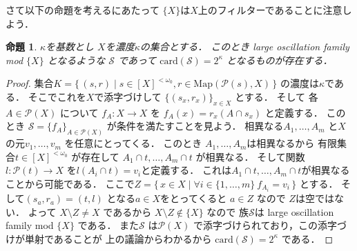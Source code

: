 \documentclass[leqno, a4paper, 12pt]{jsarticle}
\newtheorem{prop}[thm]{命題}
\newcommand{\card}{\mathrm{card}}
\newcommand{\myfinset}[1]{[#1]^{<\omega_{0}}}
\newcommand{\myfam}[1]{\mathscr{#1}}
\newcommand{\mymap}[2]{\mathrm{Map}(#1, #2)}
\newcommand{\mypowset}[1]{\mathcal{P}(#1)}
\begin{document}
さて以下の命題を考えるにあたって
$\{X\}$は$X$上のフィルターであることに注意しよう．
\begin{prop}\label{prop:oscexists}
$\kappa$を基数とし
$X$を濃度$\kappa$の集合とする．
このとき
large oscillation family mod $\{X\}$
となるような
$\myfam{S}$
であって
$\card(\myfam{S})=2^{\kappa}$
となるものが存在する．
\end{prop}
\begin{proof}
集合$K=\{\, (s, r)\mid s\in \myfinset{X}, r\in \mymap{\mypowset{s}}{X}\, \}$
の濃度は$\kappa$である．
そこでこれを$X$で添字づけして
$\{(s_{x}, r_{x})\}_{x\in X}$
とする．
そして
各$A\in \mypowset{X}$
について
$f_{A}\colon X\to X$
を
$f_{A}(x)=r_{x}(A\cap s_{x})$
と定義する．
このとき
$\myfam{S}=\{f_{A}\}_{A\in \mypowset{X}}$
が条件を満たすことを見よう．
相異なる$A_{1}, \dots, A_{m}$
と$X$の元$v_{1}, \dots, v_{m}$
を任意にとってくる．
このとき
$A_{1}, \dots, A_{m}$は相異なるから
有限集合$t\in \myfinset{X}$
が存在して
$A_{1}\cap t, \dots, A_{m}\cap t$
が相異なる．
そして関数$l\colon \mypowset{t}\to X$
を$l(A_{i}\cap t)=v_{i}$と定義する．
これは$A_{1}\cap t, \dots, A_{m}\cap t$が相異なることから可能である．
ここで$Z=\{\, x\in X\mid \forall i\in \{1, \dots, m\}\ f_{A_{i}}=v_{i}\, \}$
とする．
そして$(s_{a}, r_{a})=(t, l)$
となる$a\in X$をとってくると
$a\in Z$
なので
$Z$は空ではない．
よって
$X\setminus Z\neq X$
であるから
$X\setminus Z\not\in \{X\}$
なので
族$\myfam{S}$は
large oscillation family mod 
$\{X\}$
である．
また$\myfam{S}$
は$\mypowset{X}$
で添字づけられており，この添字づけが単射であることが
上の議論からわかるから
$\card(\myfam{S})=2^{\kappa}$
である．
\end{proof}
\end{document}
